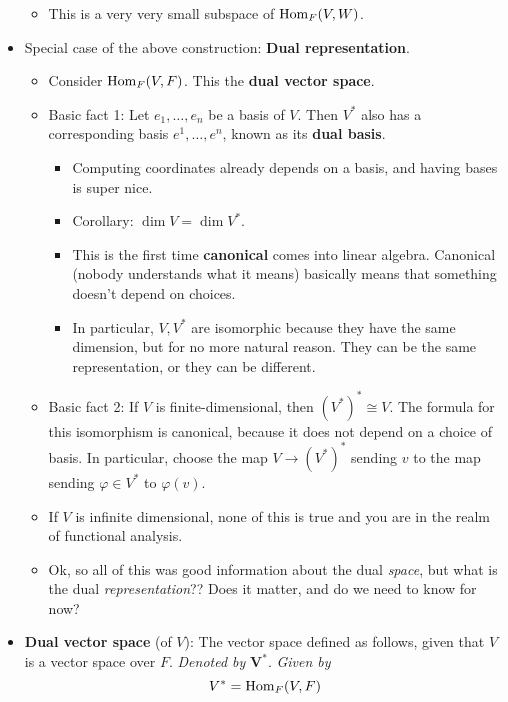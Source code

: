 \documentclass[../notes.tex]{subfiles}
\begin{document}
\begin{itemize}
    \begin{itemize}
        \item This is a very very small subspace of $\operatorname{Hom}_F(V,W)$.
    \end{itemize}
    \item Special case of the above construction: \textbf{Dual representation}.
    \begin{itemize}
        \item Consider $\operatorname{Hom}_F(V,F)$. This the \textbf{dual vector space}.
        \item Basic fact 1: Let $e_1,\dots,e_n$ be a basis of $V$. Then $V^*$ also has a corresponding basis $e^1,\dots,e^n$, known as its \textbf{dual basis}.
        \begin{itemize}
            \item Computing coordinates already depends on a basis, and having bases is super nice.
            \item Corollary: $\dim V=\dim V^*$.
            \item This is the first time \textbf{canonical} comes into linear algebra. Canonical (nobody understands what it means) basically means that something doesn't depend on choices.
            \item In particular, $V,V^*$ are isomorphic because they have the same dimension, but for no more natural reason. They can be the same representation, or they can be different.
        \end{itemize}
        \item Basic fact 2: If $V$ is finite-dimensional, then $(V^*)^*\cong V$. The formula for this isomorphism is canonical, because it does not depend on a choice of basis. In particular, choose the map $V\to(V^*)^*$ sending $v$ to the map sending $\varphi\in V^*$ to $\varphi(v)$.
        \item If $V$ is infinite dimensional, none of this is true and you are in the realm of functional analysis.
        \item Ok, so all of this was good information about the dual \emph{space}, but what is the dual \emph{representation}?? Does it matter, and do we need to know for now?
    \end{itemize}
    \item \textbf{Dual vector space} (of $V$): The vector space defined as follows, given that $V$ is a vector space over $F$. \emph{Denoted by} $\bm{V^*}$. \emph{Given by}
    \begin{equation*}
        V^* = \operatorname{Hom}_F(V,F)
    \end{equation*}

\end{itemize}
\end{document}
